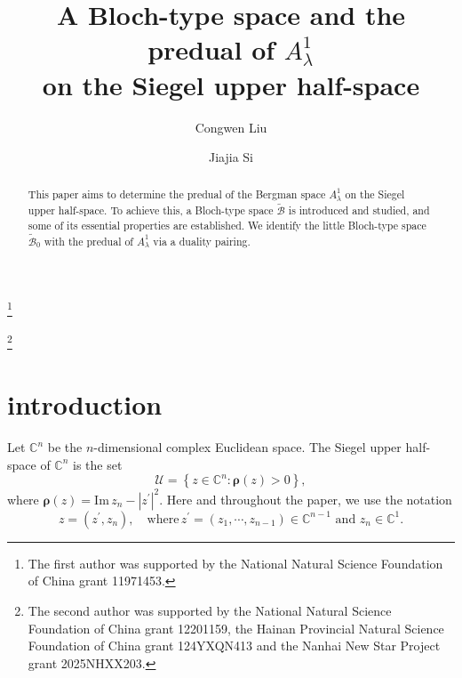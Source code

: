 \documentclass{amsart}
\numberwithin{equation}{section}
\newcommand{\ImPt}{\mathrm{Im}\,}
\newcommand{\calU}{\mathcal{U}}
\newcommand{\bfrho}{\boldsymbol{\rho}}
\newcommand{\calB}{\mathcal{B}}
\begin{document}
\title[A Bloch-type space]{A Bloch-type space and the predual of  $A_\lambda^1$\\ on the Siegel upper half-space}



\author{Congwen Liu}
\address{CAS Wu Wen-Tsun Key Laboratory of Mathematics,
School of Mathematical Sciences,
University of Science and Technology of China\\
Hefei, Anhui 230026,
People's Republic of China}
\thanks{
The first author was supported by the National Natural Science Foundation of China grant 11971453.}

\author{Jiajia Si}
\address{School of Mathematics and Statistics, Hainan University, Haikou, Hainan 570228,
People's Republic of China.}
\thanks{The second author was supported by the National Natural Science Foundation of China grant 12201159, the Hainan Provincial Natural Science Foundation of China grant 124YXQN413 
and the Nanhai New Star Project grant 2025NHXX203.}



\begin{abstract}
This paper aims to determine the predual of the Bergman space $A_\lambda^1$ on the Siegel upper half-space. To achieve this, a Bloch-type space $\widetilde{\calB}$ is introduced and studied, and some of its essential properties are established. We identify the little Bloch-type space $\widetilde{\calB}_0$ with the predual of $A_\lambda^1$ via a duality pairing.
\end{abstract}






\maketitle


\section{introduction}

Let $\mathbb{C}^n$ be the $n$-dimensional complex Euclidean space. The Siegel upper half-space of  $\mathbb{C}^n$ is the set
\[
\calU=\left\{ z\in\mathbb{C}^n:\bfrho(z)>0\right\},
\]
where $\bfrho(z)=\ImPt z_n-|z^{\prime}|^2$. 
Here and throughout the paper, we use the notation
\[
z=(z^{\prime},z_n),\quad \text{where}\, z^{\prime}=(z_1,\cdots,z_{n-1})\in\mathbb{C}^{n-1}\,\, \text{and}\,\, z_n\in\mathbb{C}^{1}.
\]
\end{document}
